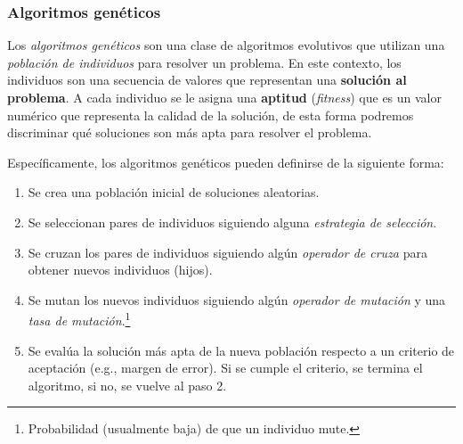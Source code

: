 \subsubsection{Algoritmos genéticos}
  Los \textit{algoritmos genéticos}\cite{hollandAdaptationNaturalArtificial2019,ahvanooeySurveyGeneticProgramming2019} son una 
  clase de algoritmos evolutivos que utilizan una \textit{población de individuos} para resolver un 
  problema.
  En este contexto, los individuos son una secuencia de valores que representan una 
  \textbf{solución al problema}.
  A cada individuo se le asigna una \textbf{aptitud} (\textit{fitness}) que es un valor numérico que 
  representa la calidad de la solución, de esta forma podremos discriminar qué soluciones son más
  apta para resolver el problema.

  Específicamente, los algoritmos genéticos pueden definirse de la siguiente forma:
  \begin{enumerate}
    \item Se crea una población inicial de soluciones aleatorias.
    \item Se seleccionan pares de individuos siguiendo alguna \textit{estrategia de 
      selección}.
    \item Se cruzan los pares de individuos siguiendo algún \textit{operador de cruza} para 
      obtener nuevos individuos (hijos).
    \item Se mutan los nuevos individuos siguiendo algún \textit{operador de mutación} y una 
      \textit{tasa de mutación}.\footnote{Probabilidad (usualmente baja) de que un individuo mute.}
    \item Se evalúa la solución más apta de la nueva población respecto a un criterio de aceptación
      (e.g., margen de error).
      Si se cumple el criterio, se termina el algoritmo, si no, se vuelve al paso 2.
  \end{enumerate}
  